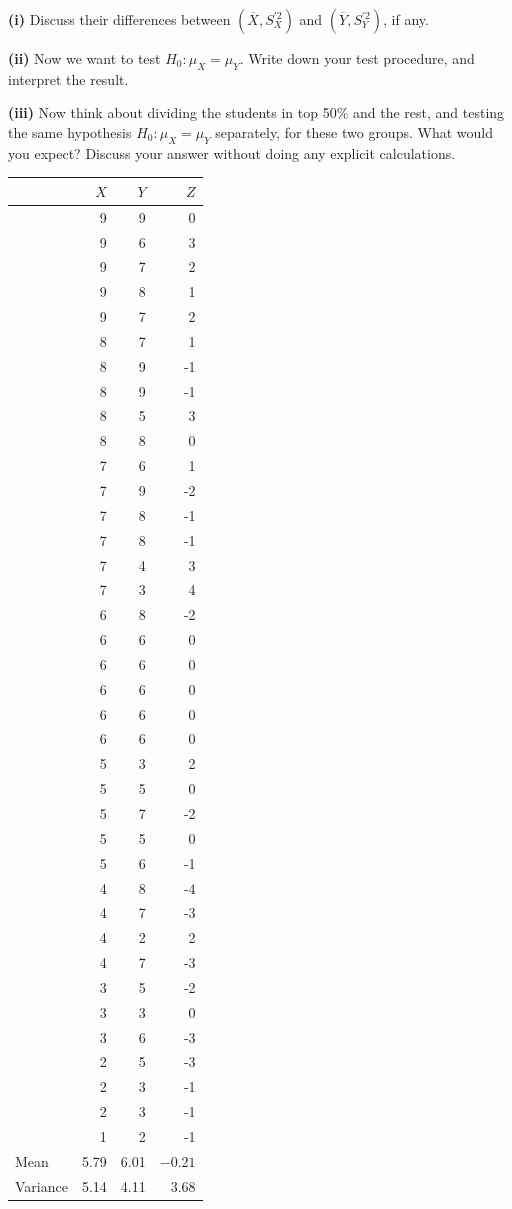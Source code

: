 \documentclass[11pt]{article}
\begin{document}
\textbf{(i)} Discuss their differences between $(\overline X, S_X^{\prime 2})$ and $(\overline Y, S_Y^{\prime 2})$, if any.

\textbf{(ii)} Now we want to test $H_0:\mu_X=\mu_Y$. Write down your test procedure, and interpret the result.

\textbf{(iii)} Now think about dividing the students in top 50\% and the rest, and testing the same hypothesis $H_0:\mu_X=\mu_Y$ separately, for these two groups. What would you expect? Discuss your answer without doing any explicit calculations.

\begin{center}
{\small
\setlength{\tabcolsep}{9pt}
\renewcommand{\arraystretch}{0.91}
\begin{tabular}{lrrr}
\hline
 & $X$ & $Y$ & $Z$ \\
\hline
 & 9 & 9 & 0 \\
 & 9 & 6 & 3 \\
 & 9 & 7 & 2 \\
 & 9 & 8 & 1 \\
 & 9 & 7 & 2 \\
 & 8 & 7 & 1 \\
 & 8 & 9 & -1 \\
 & 8 & 9 & -1 \\
 & 8 & 5 & 3 \\
 & 8 & 8 & 0 \\
 & 7 & 6 & 1 \\
 & 7 & 9 & -2 \\
 & 7 & 8 & -1 \\
 & 7 & 8 & -1 \\
 & 7 & 4 & 3 \\
 & 7 & 3 & 4 \\
 & 6 & 8 & -2 \\
 & 6 & 6 & 0 \\
 & 6 & 6 & 0 \\
 & 6 & 6 & 0 \\
 & 6 & 6 & 0 \\
 & 6 & 6 & 0 \\
 & 5 & 3 & 2 \\
 & 5 & 5 & 0 \\
 & 5 & 7 & -2 \\
 & 5 & 5 & 0 \\
 & 5 & 6 & -1 \\
 & 4 & 8 & -4 \\
 & 4 & 7 & -3 \\
 & 4 & 2 & 2 \\
 & 4 & 7 & -3 \\
 & 3 & 5 & -2 \\
 & 3 & 3 & 0 \\
 & 3 & 6 & -3 \\
 & 2 & 5 & -3 \\
 & 2 & 3 & -1 \\
 & 2 & 3 & -1 \\
 & 1 & 2 & -1 \\
\hline
Mean & 5.79 & 6.01 & $-0.21$ \\
Variance & 5.14 & 4.11 & 3.68 \\
\hline
\end{tabular}
}
\end{center}
\end{document}
